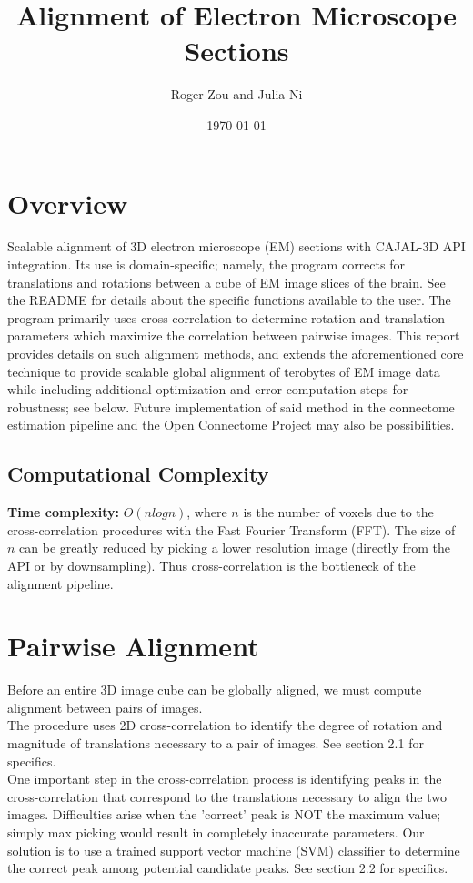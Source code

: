 \documentclass{article}
\author{Roger Zou and Julia Ni}
\date{\today}
\title{Alignment of Electron Microscope Sections}
\begin{document}
  
\maketitle

\section{Overview}
Scalable alignment of 3D electron microscope (EM) sections with CAJAL-3D API integration. Its use is domain-specific; namely, the program corrects for translations and rotations between a cube of EM image slices of the brain. See the README for details about the specific functions available to the user. The program primarily uses cross-correlation to determine rotation and translation parameters which maximize the correlation between pairwise images. This report provides details on such alignment methods, and extends the aforementioned core technique to provide scalable global alignment of terobytes of EM image data while including additional optimization and error-computation steps for robustness; see below. Future implementation of said method in the connectome estimation pipeline and the Open Connectome Project may also be possibilities. 

\subsection{Computational Complexity}
\textbf{Time complexity:} $O(nlogn)$, where $n$ is the number of voxels due to the cross-correlation procedures with the Fast Fourier Transform (FFT). The size of $n$ can be greatly reduced by picking a lower resolution image (directly from the API or by downsampling). Thus cross-correlation is the bottleneck of the alignment pipeline.

\section{Pairwise Alignment}
Before an entire 3D image cube can be globally aligned, we must compute alignment between pairs of images.
\\
The procedure uses 2D cross-correlation to identify the degree of rotation and magnitude of translations necessary to a pair of images. See section 2.1 for specifics. 
\\
One important step in the cross-correlation process is identifying peaks in the cross-correlation that correspond to the translations necessary to align the two images. Difficulties arise when the 'correct' peak is NOT the maximum value; simply max picking would result in completely inaccurate parameters. Our solution is to use a trained support vector machine (SVM) classifier to determine the correct peak among potential candidate peaks. See section 2.2 for specifics. 
\end{document}
